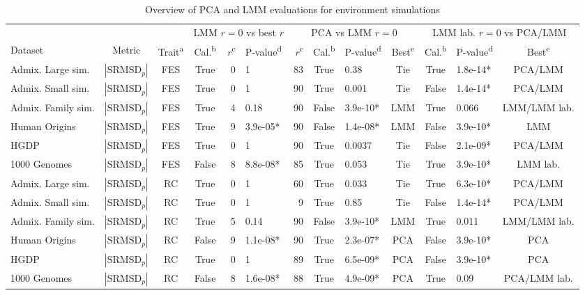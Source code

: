 \documentclass[9pt,lineno]{elife}
\newcommand{\rmsd}{\text{SRMSD}_p}
\begin{document}
\begin{table}[bt]
  \begin{fullwidth}
    \small
    \caption{Overview of PCA and LMM evaluations for environment simulations}
    \label{tab:human_sum_pcs_env}
    \begin{tabular}{lcc|crl|rclc|clc}
      \toprule
      & & & \multicolumn{3}{c|}{LMM $r=0$ vs best $r$} & \multicolumn{4}{c|}{PCA vs LMM $r=0$} & \multicolumn{3}{c}{LMM lab. $r=0$ vs PCA/LMM} \\
      Dataset & Metric & {Trait\textsuperscript{a}} & {Cal.\textsuperscript{b}} & {$r$\textsuperscript{c}} & {P-value\textsuperscript{d}} & {$r$\textsuperscript{c}} & {Cal.\textsuperscript{b}} & {P-value\textsuperscript{d}} & {Best\textsuperscript{e}} & {Cal.\textsuperscript{b}} & {P-value\textsuperscript{d}} & {Best\textsuperscript{e}} \\
      \midrule
      Admix. Large sim.	&$|\rmsd|$	&FES	&True	&0	&1	&83	&True	&0.38	&Tie	&True	&1.8e-14*	&PCA/LMM \\
      Admix. Small sim.	&$|\rmsd|$	&FES	&True	&0	&1	&90	&True	&0.001	&Tie	&False	&1.4e-14*	&PCA/LMM \\
      Admix. Family sim.	&$|\rmsd|$	&FES	&True	&4	&0.18	&90	&False	&3.9e-10*	&LMM	&True	&0.066	&LMM/LMM lab. \\
      Human Origins	&$|\rmsd|$	&FES	&True	&9	&3.9e-05*	&90	&False	&1.4e-08*	&LMM	&False	&3.9e-10*	&LMM \\
      HGDP	&$|\rmsd|$	&FES	&True	&0	&1	&90	&True	&0.0037	&Tie	&False	&2.1e-09*	&PCA/LMM \\
      1000 Genomes	&$|\rmsd|$	&FES	&False	&8	&8.8e-08*	&85	&True	&0.053	&Tie	&True	&3.9e-10*	&LMM lab. \\
      Admix. Large sim.	&$|\rmsd|$	&RC	&True	&0	&1	&60	&True	&0.033	&Tie	&True	&6.3e-10*	&PCA/LMM \\
      Admix. Small sim.	&$|\rmsd|$	&RC	&True	&0	&1	&9	&True	&0.85	&Tie	&False	&1.4e-14*	&PCA/LMM \\
      Admix. Family sim.	&$|\rmsd|$	&RC	&True	&5	&0.14	&90	&False	&3.9e-10*	&LMM	&True	&0.011	&LMM/LMM lab. \\
      Human Origins	&$|\rmsd|$	&RC	&False	&9	&1.1e-08*	&90	&True	&2.3e-07*	&PCA	&False	&3.9e-10*	&PCA \\
      HGDP	&$|\rmsd|$	&RC	&True	&0	&1	&89	&True	&6.5e-09*	&PCA	&False	&3.9e-10*	&PCA \\
      1000 Genomes	&$|\rmsd|$	&RC	&False	&8	&1.6e-08*	&88	&True	&4.9e-09*	&PCA	&True	&0.09	&PCA/LMM lab. \\

\end{tabular}
\end{fullwidth}
\end{table}
\end{document}

